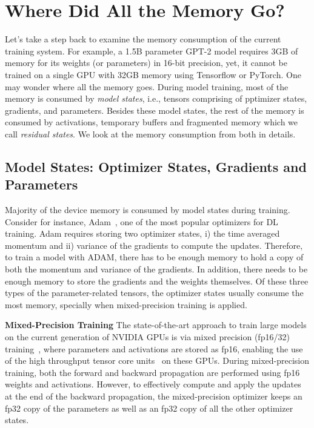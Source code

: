 \documentclass{article}
\begin{document}
\section{Where Did All the Memory Go?}
Let's take a step back to examine the memory consumption of the current training system.  For example,  a 1.5B parameter GPT-2 model requires 3GB of memory for its weights (or parameters) in 16-bit precision, yet, it cannot be trained on a single GPU with 32GB memory using Tensorflow or PyTorch.  One may wonder where all the memory goes.
During model training, most of the memory is consumed by {\it model states}, i.e., tensors comprising of pptimizer states, gradients, and parameters. Besides these model states, the rest of the memory is consumed by activations, temporary buffers and fragmented memory which we call \emph{residual states}. We look at the memory consumption from both in details.

\subsection{Model States: Optimizer States, Gradients and Parameters} Majority of the device memory is consumed by model states during training.  Consider for instance, Adam~\cite{DBLP:journals/corr/Adam}, one of the most popular optimizers for DL training. Adam requires storing two optimizer states, i) the time averaged momentum and ii) variance of the gradients to compute the updates. Therefore, to train a model with ADAM, there has to be enough memory to hold a copy of both the momentum and variance of the gradients. In addition, there needs to be enough memory to store the gradients and the weights themselves. Of these three types of the parameter-related tensors, the optimizer states usually consume the most memory, specially when mixed-precision training is applied.

\textbf{Mixed-Precision Training} The state-of-the-art approach to train large models on the current generation of NVIDIA GPUs is via mixed precision (fp16/32) training~\cite{micikevicius2017mixed}, where parameters and activations are stored as fp16, enabling the use of the high throughput tensor core units~\cite{nvidia-volta-arch} on these GPUs. During mixed-precision training, both the forward and backward propagation are performed using fp16 weights and activations. However, to effectively compute and apply the updates at the end of the backward propagation, the mixed-precision optimizer keeps an fp32 copy of the parameters as well as an fp32 copy of all the other optimizer states. 
\end{document}
